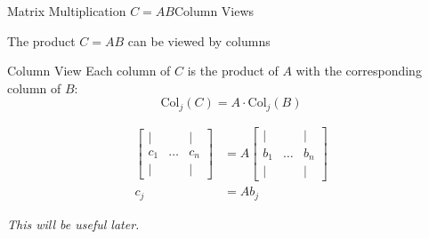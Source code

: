 \documentclass[10pt]{beamer}
\begin{document}

\begin{frame}{Matrix Multiplication $C = AB$}{Column Views}

The product $C = AB$ can be viewed by columns

\begin{block}{Column View}
Each column of \( C \) is the product of \( A \) with the corresponding column of \( B \):
$$\text{Col}_j(C) = A \cdot \text{Col}_j(B)$$
\end{block}
\begin{align*}
\begin{bmatrix}
    | &  & | \\
    c_1    & \dots  & c_n \\
    | &   & |
\end{bmatrix} &= A
\begin{bmatrix}
    | &  & | \\
    b_1    & \dots  & b_n \\
    | &   & |
\end{bmatrix}\\
c_j &= A b_j 
\end{align*}

\vspace{3mm}
\begin{center}
    \emph{This will be useful later.}
\end{center}
\end{frame}
\end{document}
